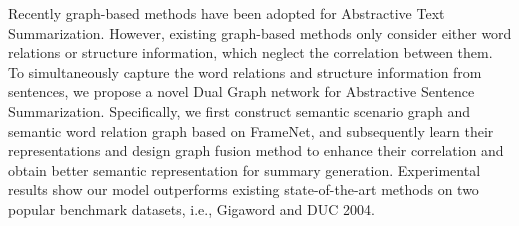 Recently graph-based methods have been adopted for Abstractive Text Summarization. However, existing graph-based methods only consider either word relations or structure information, which neglect the correlation  between them. To simultaneously capture the word relations and structure information from sentences, we propose a novel Dual Graph network for Abstractive Sentence Summarization. Specifically, we first construct semantic scenario graph and semantic word relation graph based on FrameNet, and subsequently learn their representations and design graph fusion method to enhance their correlation and obtain better semantic representation for summary generation. Experimental results show our model outperforms existing state-of-the-art methods on two popular benchmark datasets, i.e., Gigaword and DUC 2004.
